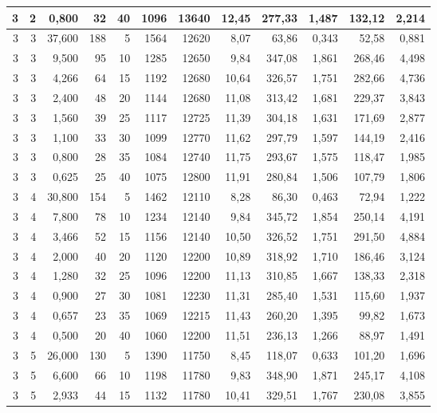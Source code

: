 \begin{tabular}{rrrrrrrrrrrr}
3 & 2 & 0,800 & 32 & 40 & 1096 & 13640 & 12,45 & 277,33 & 1,487 & 132,12 & 2,214 \\ \hline
3 & 3 & 37,600 & 188 & 5 & 1564 & 12620 & 8,07 & 63,86 & 0,343 & 52,58 & 0,881 \\ \hline
3 & 3 & 9,500 & 95 & 10 & 1285 & 12650 & 9,84 & 347,08 & 1,861 & 268,46 & 4,498 \\ \hline
3 & 3 & 4,266 & 64 & 15 & 1192 & 12680 & 10,64 & 326,57 & 1,751 & 282,66 & 4,736 \\ \hline
3 & 3 & 2,400 & 48 & 20 & 1144 & 12680 & 11,08 & 313,42 & 1,681 & 229,37 & 3,843 \\ \hline
3 & 3 & 1,560 & 39 & 25 & 1117 & 12725 & 11,39 & 304,18 & 1,631 & 171,69 & 2,877 \\ \hline
3 & 3 & 1,100 & 33 & 30 & 1099 & 12770 & 11,62 & 297,79 & 1,597 & 144,19 & 2,416 \\ \hline
3 & 3 & 0,800 & 28 & 35 & 1084 & 12740 & 11,75 & 293,67 & 1,575 & 118,47 & 1,985 \\ \hline
3 & 3 & 0,625 & 25 & 40 & 1075 & 12800 & 11,91 & 280,84 & 1,506 & 107,79 & 1,806 \\ \hline
3 & 4 & 30,800 & 154 & 5 & 1462 & 12110 & 8,28 & 86,30 & 0,463 & 72,94 & 1,222 \\ \hline
3 & 4 & 7,800 & 78 & 10 & 1234 & 12140 & 9,84 & 345,72 & 1,854 & 250,14 & 4,191 \\ \hline
3 & 4 & 3,466 & 52 & 15 & 1156 & 12140 & 10,50 & 326,52 & 1,751 & 291,50 & 4,884 \\ \hline
3 & 4 & 2,000 & 40 & 20 & 1120 & 12200 & 10,89 & 318,92 & 1,710 & 186,46 & 3,124 \\ \hline
3 & 4 & 1,280 & 32 & 25 & 1096 & 12200 & 11,13 & 310,85 & 1,667 & 138,33 & 2,318 \\ \hline
3 & 4 & 0,900 & 27 & 30 & 1081 & 12230 & 11,31 & 285,40 & 1,531 & 115,60 & 1,937 \\ \hline
3 & 4 & 0,657 & 23 & 35 & 1069 & 12215 & 11,43 & 260,20 & 1,395 & 99,82 & 1,673 \\ \hline
3 & 4 & 0,500 & 20 & 40 & 1060 & 12200 & 11,51 & 236,13 & 1,266 & 88,97 & 1,491 \\ \hline
3 & 5 & 26,000 & 130 & 5 & 1390 & 11750 & 8,45 & 118,07 & 0,633 & 101,20 & 1,696 \\ \hline
3 & 5 & 6,600 & 66 & 10 & 1198 & 11780 & 9,83 & 348,90 & 1,871 & 245,17 & 4,108 \\ \hline
3 & 5 & 2,933 & 44 & 15 & 1132 & 11780 & 10,41 & 329,51 & 1,767 & 230,08 & 3,855 \\ \hline

\end{tabular}
